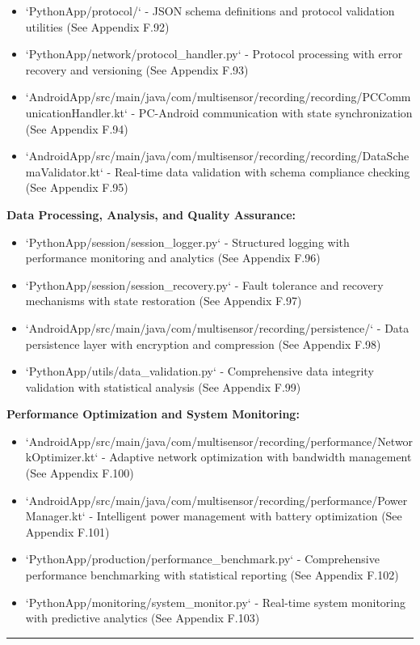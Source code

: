 \documentclass[11pt,a4paper]{report}
\begin{document}
\begin{itemize}
\item `PythonApp/protocol/` - JSON schema definitions and protocol validation utilities (See Appendix F.92)
\item `PythonApp/network/protocol_handler.py` - Protocol processing with error recovery and versioning (See Appendix
  F.93)
\item `AndroidApp/src/main/java/com/multisensor/recording/recording/PCCommunicationHandler.kt` - PC-Android communication
  with state synchronization (See Appendix F.94)
\item `AndroidApp/src/main/java/com/multisensor/recording/recording/DataSchemaValidator.kt` - Real-time data validation with
  schema compliance checking (See Appendix F.95)

\end{itemize}
\textbf{Data Processing, Analysis, and Quality Assurance:}

\begin{itemize}
\item `PythonApp/session/session_logger.py` - Structured logging with performance monitoring and analytics (See Appendix
  F.96)
\item `PythonApp/session/session_recovery.py` - Fault tolerance and recovery mechanisms with state restoration (See
  Appendix F.97)
\item `AndroidApp/src/main/java/com/multisensor/recording/persistence/` - Data persistence layer with encryption and
  compression (See Appendix F.98)
\item `PythonApp/utils/data_validation.py` - Comprehensive data integrity validation with statistical analysis (See
  Appendix F.99)

\end{itemize}
\textbf{Performance Optimization and System Monitoring:}

\begin{itemize}
\item `AndroidApp/src/main/java/com/multisensor/recording/performance/NetworkOptimizer.kt` - Adaptive network optimization
  with bandwidth management (See Appendix F.100)
\item `AndroidApp/src/main/java/com/multisensor/recording/performance/PowerManager.kt` - Intelligent power management with
  battery optimization (See Appendix F.101)
\item `PythonApp/production/performance_benchmark.py` - Comprehensive performance benchmarking with statistical
  reporting (See Appendix F.102)
\item `PythonApp/monitoring/system_monitor.py` - Real-time system monitoring with predictive analytics (See Appendix
  F.103)

\end{itemize}
\hrule
\end{document}

